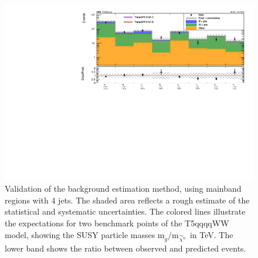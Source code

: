 \begin{figure}[!h]
\begin{center}
    \includegraphics[width=0.9 \textwidth]{Plots/analysis/results/Prediction_Spring16_templates_validation_4j_Moriond2017_lep_data_36p5_blind.pdf}
    \caption{Validation of the background estimation method, using mainband regions with 4 jets.
    The shaded area reflects a rough estimate of the statistical and systematic uncertainties.
    The colored lines illustrate the expectations for two benchmark points of the T5qqqqWW model, showing the SUSY particle masses m$_{\tilde{g}}$/m$_{\widetilde{\chi}^0}$ in TeV.
    The lower band shows the ratio between observed and predicted events.
    }
    \label{fig:validation_0b}
\end{center}
\end{figure}
